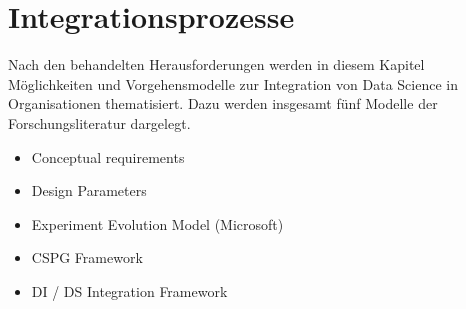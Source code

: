 \chapter[Integrationsprozesse]{Integrationsprozesse}


Nach den behandelten Herausforderungen werden in diesem Kapitel Möglichkeiten und Vorgehensmodelle zur Integration von Data Science in Organisationen thematisiert.
Dazu werden insgesamt fünf Modelle der Forschungsliteratur dargelegt.

\begin{itemize}
    \item Conceptual requirements
    \item Design Parameters
    \item Experiment Evolution Model (Microsoft)
    \item CSPG Framework
    \item DI / DS Integration Framework
\end{itemize}